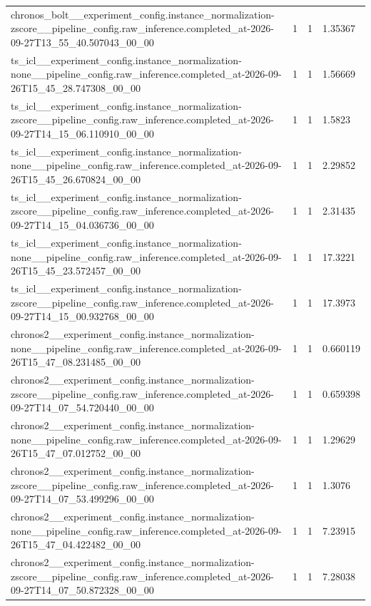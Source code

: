 \begin{tabular}{llll}
chronos\_bolt\_\_experiment\_config.instance\_normalization-zscore\_\_pipeline\_config.raw\_inference.completed\_at-2026-09-27T13\_55\_40.507043\_00\_00 & 1 & 1 & 1.35367 \\
ts\_icl\_\_experiment\_config.instance\_normalization-none\_\_pipeline\_config.raw\_inference.completed\_at-2026-09-26T15\_45\_28.747308\_00\_00 & 1 & 1 & 1.56669 \\
ts\_icl\_\_experiment\_config.instance\_normalization-zscore\_\_pipeline\_config.raw\_inference.completed\_at-2026-09-27T14\_15\_06.110910\_00\_00 & 1 & 1 & 1.5823 \\
ts\_icl\_\_experiment\_config.instance\_normalization-none\_\_pipeline\_config.raw\_inference.completed\_at-2026-09-26T15\_45\_26.670824\_00\_00 & 1 & 1 & 2.29852 \\
ts\_icl\_\_experiment\_config.instance\_normalization-zscore\_\_pipeline\_config.raw\_inference.completed\_at-2026-09-27T14\_15\_04.036736\_00\_00 & 1 & 1 & 2.31435 \\
ts\_icl\_\_experiment\_config.instance\_normalization-none\_\_pipeline\_config.raw\_inference.completed\_at-2026-09-26T15\_45\_23.572457\_00\_00 & 1 & 1 & 17.3221 \\
ts\_icl\_\_experiment\_config.instance\_normalization-zscore\_\_pipeline\_config.raw\_inference.completed\_at-2026-09-27T14\_15\_00.932768\_00\_00 & 1 & 1 & 17.3973 \\
chronos2\_\_experiment\_config.instance\_normalization-none\_\_pipeline\_config.raw\_inference.completed\_at-2026-09-26T15\_47\_08.231485\_00\_00 & 1 & 1 & 0.660119 \\
chronos2\_\_experiment\_config.instance\_normalization-zscore\_\_pipeline\_config.raw\_inference.completed\_at-2026-09-27T14\_07\_54.720440\_00\_00 & 1 & 1 & 0.659398 \\
chronos2\_\_experiment\_config.instance\_normalization-none\_\_pipeline\_config.raw\_inference.completed\_at-2026-09-26T15\_47\_07.012752\_00\_00 & 1 & 1 & 1.29629 \\
chronos2\_\_experiment\_config.instance\_normalization-zscore\_\_pipeline\_config.raw\_inference.completed\_at-2026-09-27T14\_07\_53.499296\_00\_00 & 1 & 1 & 1.3076 \\
chronos2\_\_experiment\_config.instance\_normalization-none\_\_pipeline\_config.raw\_inference.completed\_at-2026-09-26T15\_47\_04.422482\_00\_00 & 1 & 1 & 7.23915 \\
chronos2\_\_experiment\_config.instance\_normalization-zscore\_\_pipeline\_config.raw\_inference.completed\_at-2026-09-27T14\_07\_50.872328\_00\_00 & 1 & 1 & 7.28038 \\

\end{tabular}
